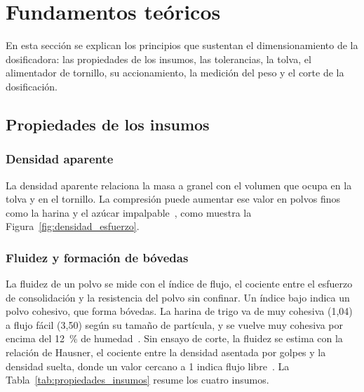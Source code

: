 \section{Fundamentos teóricos}
\label{sec:teoria_fundamentos}

En esta sección se explican los principios que sustentan el dimensionamiento de
la dosificadora: las propiedades de los insumos, las tolerancias, la tolva, el
alimentador de tornillo, su accionamiento, la medición del peso y el corte de la
dosificación.

\subsection{Propiedades de los insumos}
\label{subsec:fund_insumos}

\subsubsection{Densidad aparente}
\label{subsubsec:fund_densidad}

La densidad aparente relaciona la masa a granel con el volumen que ocupa en la
tolva y en el tornillo. La compresión puede aumentar ese valor en polvos finos
como la harina y el azúcar impalpable~\parencite{lanzerstorfer2020density}, como
muestra la Figura~\ref{fig:densidad_esfuerzo}.

\subsubsection{Fluidez y formación de bóvedas}
\label{subsubsec:fund_flujo}

La fluidez de un polvo se mide con el índice de flujo, el cociente entre el
esfuerzo de consolidación y la resistencia del polvo sin confinar. Un índice bajo
indica un polvo cohesivo, que forma bóvedas. La harina de trigo va de muy cohesiva
(1,04) a flujo fácil (3,50) según su tamaño de partícula, y se vuelve muy cohesiva
por encima del 12~\% de humedad~\parencite{siliveru2017significance}. Sin ensayo
de corte, la fluidez se estima con la relación de Hausner, el cociente entre la
densidad asentada por golpes y la densidad suelta, donde un valor cercano a 1
indica flujo libre~\parencite{dossantos2017sugar}. La
Tabla~\ref{tab:propiedades_insumos} resume los cuatro insumos.


